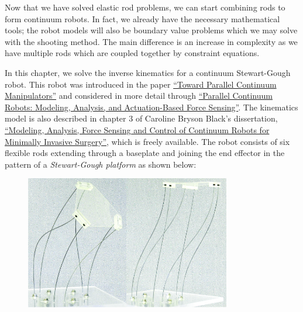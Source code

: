 \documentclass[12pt]{article}
\begin{document}
\makeatletter
\renewcommand{\@maketitle}{
\newpage
\null
\vskip 2em
\begin{center}
{\LARGE \@title \par}
\end{center}
\par
} \makeatother

\maketitle

Now that we have solved elastic rod problems, we can start combining rods to form continuum robots. In fact, we already have the necessary mathematical tools; the robot models will also be boundary value problems which we may solve with the shooting method. The main difference is an increase in complexity as we have multiple rods which are coupled together by constraint equations.

In this chapter, we solve the inverse kinematics for a continuum Stewart-Gough robot. This robot was introduced in the paper \href{https://ieeexplore.ieee.org/document/6906943}{``Toward Parallel Continuum Manipulators''} and considered in more detail through \href{https://ieeexplore.ieee.org/abstract/document/8207644}{``Parallel Continuum Robots: Modeling, Analysis, and Actuation-Based Force Sensing''}. The kinematics model is also described in chapter 3 of Caroline Bryson Black's dissertation, \href{https://trace.tennessee.edu/utk_graddiss/4443/}{``Modeling, Analysis, Force Sensing and Control of Continuum Robots for Minimally Invasive Surgery''}, which is freely available. The robot consists of six flexible rods extending through a baseplate and joining the end effector in the pattern of a \emph{Stewart-Gough platform} as shown below:
\begin{figure}[h]
	\centering
		\includegraphics[width=0.80\textwidth]{fig/PCM.jpg}
	\label{fig:PCM}
\end{figure}
\end{document}
